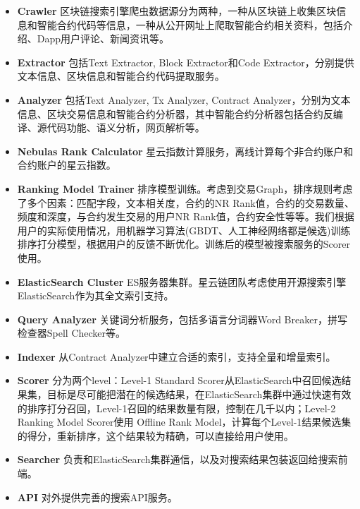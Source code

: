 \begin{itemize}
	\item \textbf{Crawler} 区块链搜索引擎爬虫数据源分为两种，一种从区块链上收集区块信息和智能合约代码等信息，一种从公开网址上爬取智能合约相关资料，包括介绍、Dapp用户评论、新闻资讯等。
	\item \textbf{Extractor} 包括Text Extractor, Block Extractor和Code Extractor，分别提供文本信息、区块信息和智能合约代码提取服务。
	\item \textbf{Analyzer} 包括Text Analyzer, Tx Analyzer, Contract Analyzer，分别为文本信息、区块交易信息和智能合约分析器，其中智能合约分析器包括合约反编译、源代码功能、语义分析，网页解析等。
	\item \textbf{Nebulas Rank Calculator} 星云指数计算服务，离线计算每个非合约账户和合约账户的星云指数。
	\item \textbf{Ranking Model Trainer} 排序模型训练。考虑到交易Graph，排序规则考虑了多个因素：匹配字段，文本相关度，合约的NR Rank值，合约的交易数量、频度和深度，与合约发生交易的用户NR Rank值，合约安全性等等。我们根据用户的实际使用情况，用机器学习算法(GBDT、人工神经网络都是候选)训练排序打分模型，根据用户的反馈不断优化。训练后的模型被搜索服务的Scorer使用。
	\item \textbf{ElasticSearch Cluster} ES服务器集群。星云链团队考虑使用开源搜索引擎ElasticSearch作为其全文索引支持。
	\item \textbf{Query Analyzer} 关键词分析服务，包括多语言分词器Word Breaker，拼写检查器Spell Checker等。
	\item \textbf{Indexer} 从Contract Analyzer中建立合适的索引，支持全量和增量索引。
	\item \textbf{Scorer} 分为两个level：Level-1 Standard Scorer从ElasticSearch中召回候选结果集，目标是尽可能把潜在的候选结果，在ElasticSearch集群中通过快速有效的排序打分召回，Level-1召回的结果数量有限，控制在几千以内；Level-2 Ranking Model Scorer使用 Offline Rank Model，计算每个Level-1结果候选集的得分，重新排序，这个结果较为精确，可以直接给用户使用。
	\item \textbf{Searcher} 负责和ElasticSearch集群通信，以及对搜索结果包装返回给搜索前端。
	\item \textbf{API} 对外提供完善的搜索API服务。
\end{itemize}

